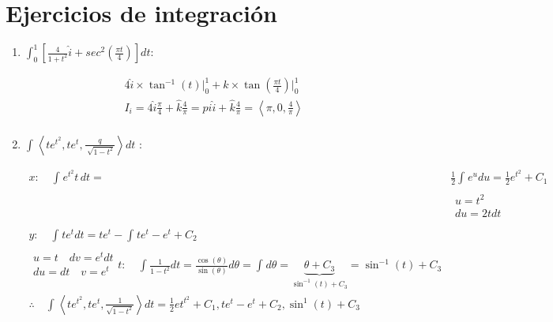 \section{Ejercicios de integración}
\begin{enumerate}
    \item $\int_{0}^{1}\left[\frac{4}{1+t^2}\hat{i} + sec^2(\frac{\pi t}{4} )\right] dt$:
        \begin{center}
            \begin{align*}
                4 \hat{i} \times \tan^{-1}(t) \Big|_0^1 + \hat{k} \times \tan(\frac{\pi t}{4} ) \Big|_{0}^{1} \\ 
                I_i = 4 \hat{i}  \frac{\pi}{4} + \hat{k} \frac{4}{\pi } = pi \hat{i} + \hat{k} \frac{4}{\pi } = \left\langle \pi,0,\frac{4}{\pi } \right\rangle \\ 
            \end{align*}
        \end{center}
    
    \item $\int_{}^{}\left\langle te^{t^2},te^t,\frac{q}{\sqrt[]{1-t^2}} \right\rangle dt$ :
        \begin{center}
            \begin{align*}
                x: \quad \int_{}^{}e^{t^2}t\,dt =& \frac{1}{2} \int_{}^{}e^{u}du = \frac{1}{2} e^{t^2} +C_1 \\ 
                    &\begin{matrix}
                        u = t^2 \\ 
                        du = 2tdt \\ 
                    \end{matrix} \\ 
                y: \quad \int_{}^{} te^{t} dt = te^{t} - \int_{}^{} te^t-e^t+C_2 \\ 
                    \begin{matrix}
                        u = t \quad dv = e^t dt \\ 
                        du = dt \quad v = e^t \\ 
                    \end{matrix}
                t: \quad \int_{}^{}\frac{1}{1-t^2} dt = \frac{\cos(\theta)}{\sin(\theta)}d\theta = \int_{}^{} d\theta = \underbrace{\theta + C_3}_{\sin^{-1}(t)+C_3} = \sin^{-1}(t)+C_3 \\
                \therefore \quad \int_{}^{} \left\langle te^{t^2},te^t,\frac{1}{\sqrt{1-t^2}} \right\rangle dt = \frac{1}{2} et^{t^2}+C_1,te^t-e^t+C_2,\sin^1(t) + C_3 \\  
            \end{align*}
        \end{center}
\end{enumerate}


